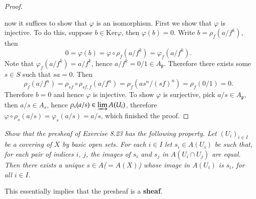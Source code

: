\begin{proof}
\begin{center}
\end{center}
now it suffices to show that $\varphi$ is an isomorphism. First we show that $\varphi$ is injective. To do this, suppose $b\in\mathrm{Ker}\varphi$, then $\varphi(b)=0$. Write $b=\rho_f(a/f^k)$, then 
$$
0=\varphi(b)=\varphi\circ\rho_f(a/f^k)=\varphi_f(a/f^k).
$$
Note that $\varphi_f(a/f^k)=a/f^k$, hence $a/f^k=0/1\in A_\mathfrak{p}$. Therefore there exists some $s\in S$ such that $sa=0$. Then 
$$
\rho _f\left( a/f^n \right) =\rho _{sf}\circ \rho _{sf,f}\left( a/f^n \right) =\rho _f\left( as^n/\left( sf \right) ^n \right) =\rho _f\left( 0/1 \right) =0.
$$
Therefore $b=0$ and hence $\varphi$ is injective. To show $\varphi$ is surjective, pick $a/s\in A_\mathfrak{p}$, then $a/s\in A_s$, hence $\rho_s(a/s)\in\varinjlim A(U_i)$, therefore $\varphi\circ\rho_s(a/s)=\varphi_s(a/s)=a/s$, which finished the proof.
\end{proof}
\begin{problem}\em
Show that the presheaf of Exercise 8.23 has the following property. Let $(U_i)_{i\in I}$ be a covering of $X$ by basic open sets. For each $i\in I$ let $s_i\in A(U_i)$ be such that, for each pair of indices $i$, $j$, the images of $s_i$ and $s_j$ in $A(U_i\cap U_j)$ are equal. Then there exists a unique $s\in A$($=A(X)$) whose image in $A(U_i)$ is $s_i$, for all $i\in I$.\par
This essentially implies that the presheaf is a \textbf{sheaf}.
\end{problem}
